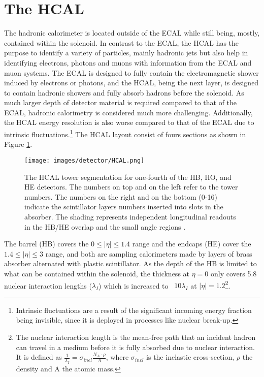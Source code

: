 \section{The HCAL}
\noindent\justify
The hadronic calorimeter is located outside of the ECAL while still being, mostly, contained within the solenoid.
In contrast to the ECAL, the HCAL has the purpose to identify a variety of particles, mainly hadronic jets but also help in identifying electrons, photons and muons with information from the ECAL and muon systems. 
The ECAL is designed to fully contain the electromagnetic shower induced by electrons or photons, and the HCAL, being the next layer, is designed to contain hadronic showers and fully absorb hadrons before the solenoid. 
As much larger depth of detector material is required compared to that of the ECAL, hadronic calorimetry is considered much more challenging. 
Additionally, the HCAL energy resolution is also worse compared to that of the ECAL due to intrinsic fluctuations.\footnote{Intrinsic fluctuations are a result of the significant incoming energy fraction being invisible, since it is deployed in processes like nuclear break-up.}
\newpara
\noindent\justify
The HCAL layout consist of fours sections as shown in Figure \ref{fig:HCAL}. 
\begin{figure}[!htp]
  \centering
   \texttt{[image: images/detector/HCAL.png]}
   \caption{The HCAL tower segmentation for one-fourth of the HB, HO, and HE detectors. The numbers on top and on the left refer to the tower numbers. The numbers on the right and on the bottom (0-16) indicate the scintillator layers numbers inserted into slots in the absorber. The shading represents independent longitudinal readouts in the HB/HE overlap and the small angle regions \cite{Baiatian:2007xva}.}
   \label{fig:HCAL}
\end{figure}                                                                                            
The barrel (HB) covers the $0\leq|\eta|\leq1.4$ range and the endcaps (HE) cover the $1.4\leq|\eta|\leq3$ range, and both are sampling calorimeters made by layers of brass absorber alternated with plastic scintillator. 
As the depth of the HB is limited to what can be contained within the solenoid, the thickness at $\eta=0$ only covers 5.8 nuclear interaction lengths ($\lambda_{I}$) which is increased to ~$10\lambda_{I}$ at $|\eta|=1.2$\footnote{The nuclear interaction length is the mean-free path that an incident hadron can travel in a medium before it is fully absorbed due to nuclear interaction. It is defined as $\frac{1}{\lambda_{I}}=\sigma_{inel}\frac{N_{A}\cdot\rho}{A}$, where $\sigma_{inel}$ is the inelastic cross-section, $\rho$ the density and A the atomic mass.}. 
